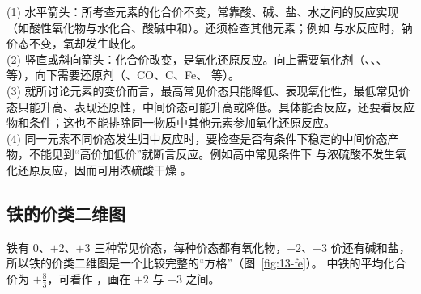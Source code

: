 \begin{gainian}[价类二维图的读法]
(1) 水平箭头：所考查元素的化合价不变，常靠酸、碱、盐、水之间的反应实现（如酸性氧化物与水化合、酸碱中和）。还须检查其他元素；例如  与水反应时，钠价态不变，氧却发生歧化。\\
(2) 竖直或斜向箭头：化合价改变，是氧化还原反应。向上需要氧化剂（、、、 等），向下需要还原剂（、CO、C、Fe、 等）。\\
(3) 就所讨论元素的变价而言，最高常见价态只能降低、表现氧化性，最低常见价态只能升高、表现还原性，中间价态可能升高或降低。具体能否反应，还要看反应物和条件；这也不能排除同一物质中其他元素参加氧化还原反应。\\
(4) 同一元素不同价态发生归中反应时，要检查是否有条件下稳定的中间价态产物，不能见到“高价加低价”就断言反应。例如高中常见条件下  与浓硫酸不发生氧化还原反应，因而可用浓硫酸干燥 。
\end{gainian}

\subsection{铁的价类二维图}
铁有 0、$+2$、$+3$ 三种常见价态，每种价态都有氧化物，$+2$、$+3$ 价还有碱和盐，所以铁的价类二维图是一个比较完整的“方格”（图~\ref{fig:13-fe}）。 中铁的平均化合价为 $+\frac{8}{3}$，可看作 ，画在 $+2$ 与 $+3$ 之间。

